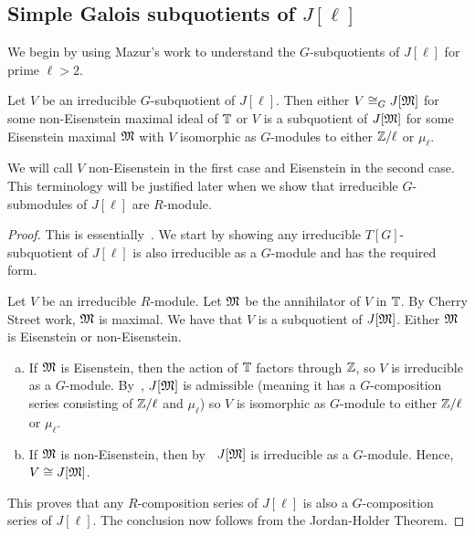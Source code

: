 \documentclass{article}
\begin{document}
\subsection{Simple Galois subquotients of $J[\ell]$}

We begin by using Mazur's work to understand the $G$-subquotients of $J[\ell]$
for prime $\ell>2$. 

\begin{theorem}\label{theorem:irreducible_G_sub}
    Let $V$ be an irreducible $G$-subquotient of $J[\ell]$. Then either $V\cong_G
    J[\mathfrak{M}]$ for some non-Eisenstein maximal ideal of $\mathbb{T}$ or $V$ is a
    subquotient of $J[\mathfrak{M}]$ for some Eisenstein maximal $\mathfrak{M}$ with $V$
    isomorphic as $G$-modules to either $\mathbb{Z}/\ell$ or $\mu_\ell$.

    We will call $V$ non-Eisenstein in the first case and Eisenstein in the
    second case. This terminology will be justified later when we show that
    irreducible $G$-submodules of $J[\ell]$ are $R$-module.
\end{theorem}
\begin{proof}
    This is essentially~\cite[\S 14]{mazur:eisenstein}. We start by showing any
    irreducible $T[G]$-subquotient of $J[\ell]$ is also irreducible as a
    $G$-module and has the required form.

    Let $V$ be an irreducible $R$-module. Let $\mathfrak{M}$ be the annihilator of $V$
    in $\mathbb{T}$. By Cherry Street work, $\mathfrak{M}$ is maximal. We have that $V$ is a
    subquotient of $J[\mathfrak{M}]$. Either $\mathfrak{M}$ is Eisenstein or non-Eisenstein.
    \begin{enumerate}[(a)]
        \item
            If $\mathfrak{M}$ is Eisenstein, then the action of $\mathbb{T}$ factors through
            $\mathbb{Z}$, so $V$ is irreducible as a $G$-module. By~\cite[Proposition
            14.1]{mazur:eisenstein}, $J[\mathfrak{M}]$ is admissible (meaning it has a
            $G$-composition series consisting of $\mathbb{Z}/\ell$ and $\mu_\ell$) so
            $V$ is isomorphic as $G$-module to either $\mathbb{Z}/\ell$ or $\mu_\ell$.
        \item
            If $\mathfrak{M}$ is non-Eisenstein, then by~\cite[Proposition
            14.2]{mazur:eisenstein} $J[\mathfrak{M}]$ is irreducible as a $G$-module.
            Hence, $V\cong J[\mathfrak{M}]$.
    \end{enumerate}
    This proves that any $R$-composition series of $J[\ell]$ is also a
    $G$-composition series of $J[\ell]$. The conclusion now follows from the
    Jordan-Holder Theorem.
\end{proof} 
\end{document}
